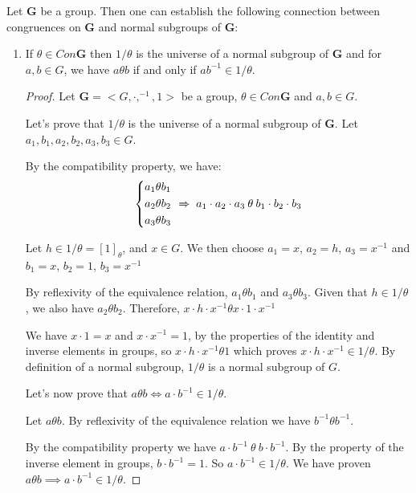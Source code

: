 \begin{example}
  Let $\boldsymbol{G}$ be a group. Then one can establish the following
  connection between congruences on $\boldsymbol{G}$ and normal subgroups of
  $\boldsymbol{G}$:
  \begin{enumerate}
  \item If $\theta \in Con \boldsymbol{G}$ then $1 / \theta$ is the universe of
    a normal subgroup of $\boldsymbol{G}$ and for $a,b \in G$, we have
    $a \theta b$ if and only if $ab^{-1} \in 1 / \theta$.

    \begin{proof}
      Let $\boldsymbol{G} = <G, \cdot, ^{-1},1>$ be a group, $\theta \in Con \boldsymbol{G}$ and $a,b \in G$.

      Let's prove that $1 / \theta$ is the universe of a normal subgroup of $\boldsymbol{G}$. Let $a_1, b_1, a_2, b_2, a_3, b_3 \in G$.

      By the compatibility property, we have:
      \begin{equation}
        \begin{dcases}
        a_1 \theta b_1 \\
        a_2 \theta b_2 \\
        a_3 \theta b_3 \end{dcases}
      \; \xRightarrow{} \;
      a_1 \cdot a_2 \cdot a_3 \: \theta \: b_1 \cdot b_2 \cdot b_3
    \end{equation}

    Let $h \in 1 / \theta = [1]_{\theta}$, and $x \in G$. We then choose $a_1 = x$, $a_2 = h$, $a_3 = x^{-1}$ and $b_1 = x$, $b_2 = 1$, $b_3 = x^{-1}$

    By reflexivity of the equivalence relation, $a_1 \theta b_1$ and
    $a_3 \theta b_3$. Given that $h \in 1 / \theta$, we also have
    $a_2 \theta b_2$. Therefore, $x \cdot h \cdot x^{-1} \theta x \cdot 1 \cdot x^{-1}$

    We have $x \cdot 1 = x$ and $x \cdot x^{-1} = 1$, by the properties of the
    identity and inverse elements in groups, so
    $x \cdot h \cdot x^{-1} \theta 1$ which proves
    $x \cdot h \cdot x^{-1} \in 1 / \theta$. By definition of a normal subgroup,
    $1 / \theta$ is a normal subgroup of $G$.

    Let's now prove that $a \theta b \iff a \cdot b^{-1} \in 1 / \theta$.

    Let $a \theta b$. By reflexivity of the equivalence relation we have
    $b^{-1} \theta b^{-1}$.

    By the compatibility property we have
    $a \cdot b^{-1} \: \theta \: b \cdot b^{-1}$. By the property of the
    inverse element in groups, $b \cdot b^{-1} = 1$. So $a \cdot b^{-1} \in 1 / \theta$. We have
    proven $a \theta b \implies a \cdot b^{-1} \in 1 / \theta$.


\end{proof}
\end{enumerate}
\end{example}
